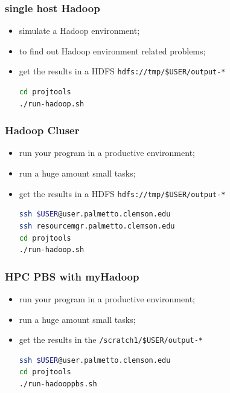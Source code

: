 \documentclass{beamer}
\theoremstyle{definition}
\theoremstyle{remark}
\begin{document}
\begin{frame}[fragile]
  \frametitle<presentation>{single host Hadoop}

    \begin{itemize}
      \item simulate a Hadoop environment;
      \item to find out Hadoop environment related problems;

      \item get the results in a HDFS \texttt{hdfs://tmp/\${USER}/output-*}
\begin{lstlisting}[language=bash]
cd projtools
./run-hadoop.sh
\end{lstlisting}
    \end{itemize}

\end{frame}



\begin{frame}[fragile]
  \frametitle<presentation>{Hadoop Cluser}

    \begin{itemize}
      \item run your program in a productive environment;
      \item run a huge amount small tasks;

      \item get the results in a HDFS \texttt{hdfs://tmp/\${USER}/output-*}
\begin{lstlisting}[language=bash]
ssh $USER@user.palmetto.clemson.edu
ssh resourcemgr.palmetto.clemson.edu
cd projtools
./run-hadoop.sh
\end{lstlisting}
    \end{itemize}

\end{frame}


\begin{frame}[fragile]
  \frametitle<presentation>{HPC PBS with myHadoop}

    \begin{itemize}
      \item run your program in a productive environment;
      \item run a huge amount small tasks;

      \item get the results in the \texttt{/scratch1/\${USER}/output-*}
\begin{lstlisting}[language=bash]
ssh $USER@user.palmetto.clemson.edu
cd projtools
./run-hadooppbs.sh
\end{lstlisting}
    \end{itemize}

\end{frame}
\end{document}
